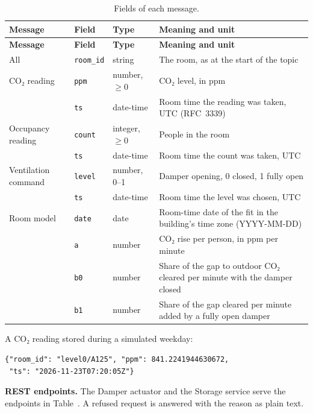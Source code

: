 \documentclass[11pt]{article}
\def\ref#1{\getrefnumber{#1}}%
\begin{document}
\begin{longtable}[]{@{}
  >{\raggedright\arraybackslash}p{}
  >{\raggedright\arraybackslash}p{}
  >{\raggedright\arraybackslash}p{}
  >{\raggedright\arraybackslash}p{}@{}}
\caption{Fields of each message.}\label{tab:fields}\\
\toprule
\textbf{Message} & \textbf{Field} & \textbf{Type} & \textbf{Meaning and
unit} \\
\midrule
\endfirsthead
\toprule
\textbf{Message} & \textbf{Field} & \textbf{Type} & \textbf{Meaning and
unit} \\
\midrule
\endhead
All & \texttt{room\_id} & string & The room, as at the start of the
topic \\
\midrule
CO₂ reading & \texttt{ppm} & number, $\geq 0$ & CO₂ level, in ppm \\
 & \texttt{ts} & date-time & Room time the reading was taken, UTC
(RFC~3339) \\
\midrule
Occupancy reading & \texttt{count} & integer, $\geq 0$ & People in the
room \\
 & \texttt{ts} & date-time & Room time the count was taken, UTC \\
\midrule
Ventilation command & \texttt{level} & number, 0--1 & Damper opening,
0 closed, 1 fully open \\
 & \texttt{ts} & date-time & Room time the level was chosen, UTC \\
\midrule
Room model & \texttt{date} & date & Room-time date of the fit in the
building's time zone (YYYY-MM-DD) \\
 & \texttt{a} & number & CO₂ rise per person, in ppm per minute \\
 & \texttt{b0} & number & Share of the gap to outdoor CO₂ cleared per
minute with the damper closed \\
 & \texttt{b1} & number & Share of the gap cleared per minute added by
a fully open damper \\
\bottomrule
\end{longtable}

A CO₂ reading stored during a simulated weekday:

\begin{verbatim}
{"room_id": "level0/A125", "ppm": 841.2241944630672,
 "ts": "2026-11-23T07:20:05Z"}
\end{verbatim}

\textbf{REST endpoints.} The Damper actuator and the Storage service
serve the endpoints in Table~\ref{tab:endpoints}. A refused request is
answered with the reason as plain text.
\end{document}
